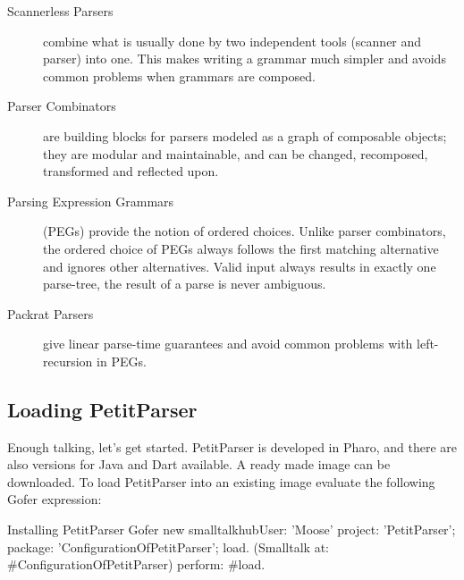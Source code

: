 \documentclass[a4paper,10pt,twoside]{book}
\begin{document}
\begin{description}
\item[Scannerless Parsers] combine what is usually done by two
  independent tools (scanner and parser) into one. This makes writing
  a grammar much simpler and avoids common problems when grammars are
  composed.

\item[Parser Combinators] are building blocks for parsers modeled as a
  graph of composable objects; they are modular and maintainable, and
  can be changed, recomposed, transformed and reflected upon.

\item[Parsing Expression Grammars] (PEGs) provide the notion of
  ordered choices. Unlike parser combinators, the ordered choice of
  PEGs always follows the first matching alternative and ignores other
  alternatives. Valid input always results in exactly one parse-tree,
  the result of a parse is never ambiguous.

\item[Packrat Parsers] give linear parse-time guarantees and avoid
  common problems with left-recursion in PEGs.
\end{description}

\subsection{Loading PetitParser}

Enough talking, let's get started. PetitParser is developed in Pharo,
and there are also versions for Java and Dart available. A ready made
image can be downloaded\footnotemark. To load PetitParser into an
existing image evaluate the following Gofer expression:


\begin{script}{Installing PetitParser}
Gofer new
  smalltalkhubUser: 'Moose' project: 'PetitParser';
  package: 'ConfigurationOfPetitParser';
  load.
(Smalltalk at: #ConfigurationOfPetitParser) perform: #load.
\end{script}


\end{document}
